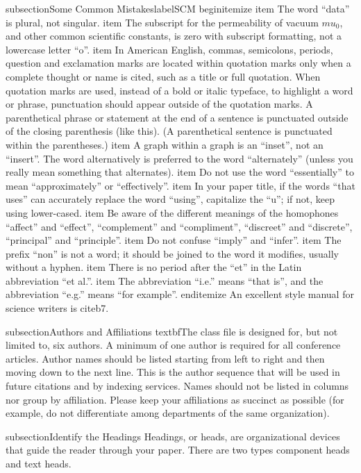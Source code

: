subsection{Some Common Mistakes}label{SCM}
begin{itemize}
item The word ``data'' is plural, not singular.
item The subscript for the permeability of vacuum $mu_{0}$, and other common scientific constants, is zero with subscript formatting, not a lowercase letter ``o''.
item In American English, commas, semicolons, periods, question and exclamation marks are located within quotation marks only when a complete thought or name is cited, such as a title or full quotation. When quotation marks are used, instead of a bold or italic typeface, to highlight a word or phrase, punctuation should appear outside of the quotation marks. A parenthetical phrase or statement at the end of a sentence is punctuated outside of the closing parenthesis (like this). (A parenthetical sentence is punctuated within the parentheses.)
item A graph within a graph is an ``inset'', not an ``insert''. The word alternatively is preferred to the word ``alternately'' (unless you really mean something that alternates).
item Do not use the word ``essentially'' to mean ``approximately'' or ``effectively''.
item In your paper title, if the words ``that uses'' can accurately replace the word ``using'', capitalize the ``u''; if not, keep using lower-cased.
item Be aware of the different meanings of the homophones ``affect'' and ``effect'', ``complement'' and ``compliment'', ``discreet'' and ``discrete'', ``principal'' and ``principle''.
item Do not confuse ``imply'' and ``infer''.
item The prefix ``non'' is not a word; it should be joined to the word it modifies, usually without a hyphen.
item There is no period after the ``et'' in the Latin abbreviation ``et al.''.
item The abbreviation ``i.e.'' means ``that is'', and the abbreviation ``e.g.'' means ``for example''.
end{itemize}
An excellent style manual for science writers is cite{b7}.

subsection{Authors and Affiliations}
textbf{The class file is designed for, but not limited to, six authors.} A 
minimum of one author is required for all conference articles. Author names 
should be listed starting from left to right and then moving down to the 
next line. This is the author sequence that will be used in future citations 
and by indexing services. Names should not be listed in columns nor group by 
affiliation. Please keep your affiliations as succinct as possible (for 
example, do not differentiate among departments of the same organization).

subsection{Identify the Headings}
Headings, or heads, are organizational devices that guide the reader through 
your paper. There are two types component heads and text heads.

